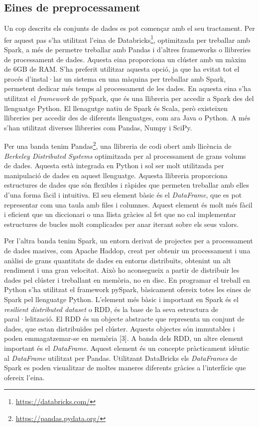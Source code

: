 \documentclass[10pt,a4paper,twocolumn,twoside]{article}
\begin{document}
\subsection{Eines de preprocessament}
Un cop descrits els conjunts de dades es pot començar amb el seu tractament. Per fer aquest pas s'ha utilitzat l'eina de Databricks\footnote{\url{https://databricks.com/}}, optimitzada per treballar amb Spark, a més de permetre treballar amb Pandas i d'altres frameworks o llibreries de processament de dades. Aquesta eina proporciona un clúster amb un màxim de 6GB de RAM. S'ha preferit utilitzar aquesta opció, ja que ha evitat tot el procés d'instal·lar un sistema en una màquina per treballar amb Spark, permetent dedicar més temps al processament de les dades. En aquesta eina s'ha utilitzat el \textit{framework} de pySpark, que és una llibreria per accedir a Spark des del llenguatge Python. El llenagutge natiu de Spark és Scala, però existeixen llibreries per accedir des de diferents llenguatges, com ara Java o Python. A més s'han utilitzat diverses llibreries com Pandas, Numpy i SciPy.

Per una banda tenim Pandas\footnote{\url{https://pandas.pydata.org/}}, una llibreria de codi obert amb llicència de \textit{Berkeley Distributed Systems} optimitzada per al processament de grans volums de dades. Aquesta està integrada en Python i sol ser molt utilitzada per manipulació de dades en aquest llenguatge. Aquesta llibreria proporciona estructures de dades que són flexibles i ràpides que permeten treballar amb elles d'una forma fàcil i intuitiva. El seu element bàsic és el \textit{DataFrame}, que es pot representar com una taula amb files i columnes. Aquest element és molt més fàcil i eficient que un diccionari o una llista gràcies al fet que no cal implementar estructures de bucles molt complicades per anar iterant sobre els seus valors.

Per l'altra banda tenim Spark, un entorn derivat de projectes per a processament de dades masives, com Apache Haddop, creat per obtenir un processament i una anàlisi de grans quantitats de dades en entorns distribuïts, obtenint un alt rendiment i una gran velocitat. Això ho aconsegueix a partir de distribuir les dades pel clúster i treballant en memòria, no en disc. En programar el treball en Python s'ha utilitzat el framework pySpark, bàsicament ofereix totes les eines de Spark pel llenguatge Python. L'element més bàsic i important en Spark és el \textit{resilient distributed dataset} o RDD, és la base de la seva estructura de paral·lelització. El RDD és un objecte abstracte que representa un conjunt de dades, que estan distribuïdes pel clúster. Aquests objectes són immutables i poden emmagatzemar-se en memòria [3]. A banda dels RDD, un altre element important és el \textit{DataFrame}. Aquest element és un concepte pràcticament idèntic al \textit{DataFrame} utilitzat per Pandas. Utilitzant DataBricks els \textit{DataFrames} de Spark es poden visualitzar de moltes maneres diferents gràcies a l'interfície que ofereix l'eina.
\end{document}
